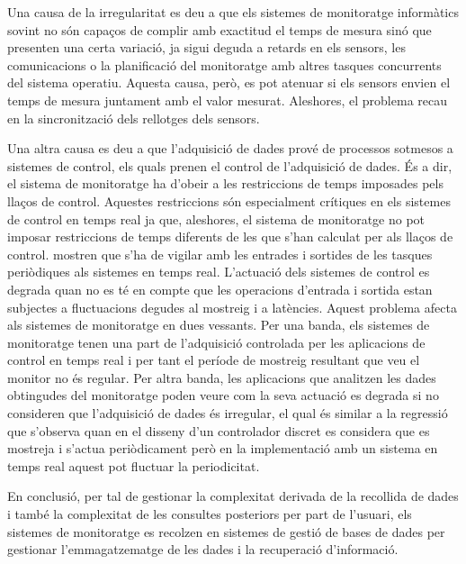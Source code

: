 \begin{enumerate}
Una causa de la irregularitat es deu a que els sistemes de monitoratge informàtics sovint no són capaços de complir amb exactitud el temps de mesura sinó que presenten una certa variació, ja sigui deguda a retards en els sensors, les comunicacions o la planificació del monitoratge amb altres tasques concurrents del sistema operatiu. Aquesta causa, però, es pot atenuar si els sensors envien el temps de mesura juntament amb el valor mesurat. Aleshores, el problema recau en la sincronització dels rellotges dels sensors. 

Una altra causa es deu a que l'adquisició de dades prové de processos sotmesos a sistemes de control, els quals prenen el control de l'adquisició de dades. És a dir, el sistema de monitoratge ha d'obeir a les restriccions de temps imposades pels llaços de control. Aquestes restriccions són especialment crítiques en els sistemes de control en temps real ja que, aleshores, el sistema de monitoratge no pot imposar restriccions de temps diferents de les que s'han calculat per als llaços de control.  \textcite{lozoya08} mostren que s'ha de vigilar amb les entrades i sortides de les tasques periòdiques als sistemes en temps real. L'actuació dels sistemes de control es degrada quan no es té en compte que les operacions d'entrada i sortida estan subjectes a fluctuacions degudes al mostreig i a latències. Aquest problema afecta als sistemes de monitoratge en dues vessants.
Per una banda, els sistemes de monitoratge tenen una part de l'adquisició controlada per les aplicacions de control en temps real i per tant el període de mostreig resultant que veu el monitor no és regular. 
Per altra banda, les aplicacions que analitzen les dades obtingudes del monitoratge poden veure com la seva actuació es degrada si no consideren que l'adquisició de dades és irregular, el qual és similar a la regressió que s'observa \parencite{lozoya08} quan en el disseny d'un controlador discret es considera que es mostreja i s'actua periòdicament però en la implementació amb un sistema en temps real aquest pot fluctuar la periodicitat.

\end{enumerate}



En conclusió, per tal de gestionar la complexitat derivada de la recollida de dades i també la complexitat de les consultes posteriors per part de l'usuari, els sistemes de monitoratge es recolzen en sistemes de gestió de bases de dades per gestionar l'emmagatzematge de les dades i la recuperació d'informació.






